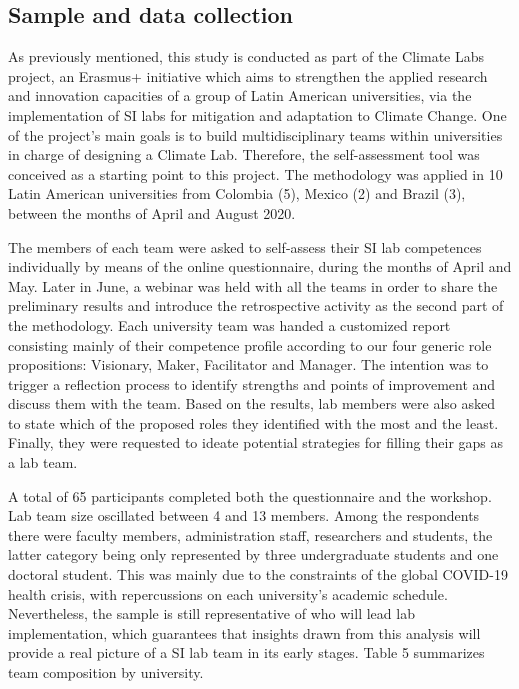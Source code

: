 \documentclass[AMA,STIX1COL,APA,STIX2COL]{WileyNJD-v2}
\begin{document}
\hypertarget{sample-and-data-collection}{%
\subsection{Sample and data
collection}\label{sample-and-data-collection}}

As previously mentioned, this study is conducted as part of the Climate
Labs project, an Erasmus+ initiative which aims to strengthen the
applied research and innovation capacities of a group of Latin American
universities, via the implementation of SI labs for mitigation and
adaptation to Climate Change. One of the project's main goals is to
build multidisciplinary teams within universities in charge of designing
a Climate Lab. Therefore, the self-assessment tool was conceived as a
starting point to this project. The methodology was applied in 10 Latin
American universities from Colombia (5), Mexico (2) and Brazil (3),
between the months of April and August 2020.

The members of each team were asked to self-assess their SI lab
competences individually by means of the online questionnaire, during
the months of April and May. Later in June, a webinar was held with all
the teams in order to share the preliminary results and introduce the
retrospective activity as the second part of the methodology. Each
university team was handed a customized report consisting mainly of
their competence profile according to our four generic role
propositions: Visionary, Maker, Facilitator and Manager. The intention
was to trigger a reflection process to identify strengths and points of
improvement and discuss them with the team. Based on the results, lab
members were also asked to state which of the proposed roles they
identified with the most and the least. Finally, they were requested to
ideate potential strategies for filling their gaps as a lab team.

A total of 65 participants completed both the questionnaire and the
workshop. Lab team size oscillated between 4 and 13 members. Among the
respondents there were faculty members, administration staff,
researchers and students, the latter category being only represented by
three undergraduate students and one doctoral student. This was mainly
due to the constraints of the global COVID-19 health crisis, with
repercussions on each university's academic schedule. Nevertheless, the
sample is still representative of who will lead lab implementation,
which guarantees that insights drawn from this analysis will provide a
real picture of a SI lab team in its early stages. Table 5 summarizes
team composition by university.
\end{document}
